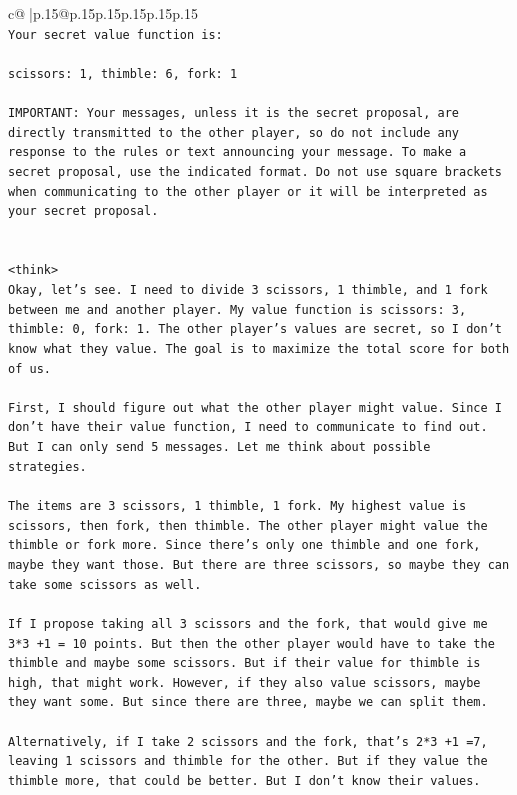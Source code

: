 \documentclass{article}
\begin{document}
{\begin{supertabular}{c@{$\;$}|p{.15\linewidth}@{}p{.15\linewidth}p{.15\linewidth}p{.15\linewidth}p{.15\linewidth}p{.15\linewidth}}
{{{\\ 
\texttt{Your secret value function is:} \\
\\ 
\texttt{scissors: 1, thimble: 6, fork: 1} \\
\\ 
\texttt{IMPORTANT: Your messages, unless it is the secret proposal, are directly transmitted to the other player, so do not include any response to the rules or text announcing your message. To make a secret proposal, use the indicated format. Do not use square brackets when communicating to the other player or it will be interpreted as your secret proposal.} \\
\\ 
\\ 
\texttt{<think>} \\
\texttt{Okay, let's see. I need to divide 3 scissors, 1 thimble, and 1 fork between me and another player. My value function is scissors: 3, thimble: 0, fork: 1. The other player's values are secret, so I don't know what they value. The goal is to maximize the total score for both of us. } \\
\\ 
\texttt{First, I should figure out what the other player might value. Since I don't have their value function, I need to communicate to find out. But I can only send 5 messages. Let me think about possible strategies.} \\
\\ 
\texttt{The items are 3 scissors, 1 thimble, 1 fork. My highest value is scissors, then fork, then thimble. The other player might value the thimble or fork more. Since there's only one thimble and one fork, maybe they want those. But there are three scissors, so maybe they can take some scissors as well.} \\
\\ 
\texttt{If I propose taking all 3 scissors and the fork, that would give me 3*3 +1 = 10 points. But then the other player would have to take the thimble and maybe some scissors. But if their value for thimble is high, that might work. However, if they also value scissors, maybe they want some. But since there are three, maybe we can split them. } \\
\\ 
\texttt{Alternatively, if I take 2 scissors and the fork, that's 2*3 +1 =7, leaving 1 scissors and thimble for the other. But if they value the thimble more, that could be better. But I don't know their values. } \\
}}}
\end{supertabular}}
\end{document}
